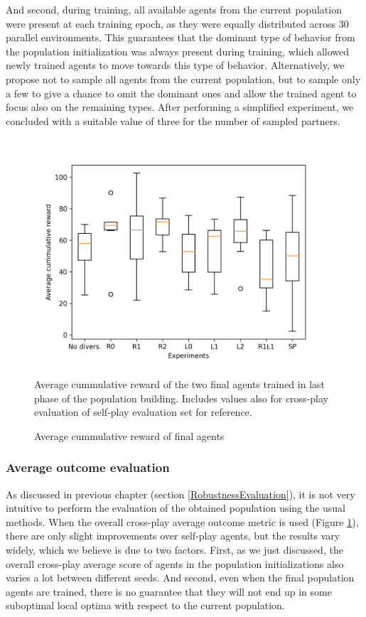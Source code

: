 And second, during training, all available agents from the current population were present at each training epoch, as they were equally distributed across 30 parallel environments.
This guarantees that the dominant type of behavior from the population initialization was always present during training, which allowed newly trained agents to move towards this type of behavior.
Alternatively, we propose not to sample all agents from the current population, but to sample only a few to give a chance to omit the dominant ones and allow the trained agent to focus also on the remaining types.
After performing a simplified experiment, we concluded with a suitable value of three for the number of sampled partners. 


\begin{figure}[!ht]
    \centering
    \includegraphics*[width=14cm]{../img/SimpleCnnExperimentsAvg.png}

    \caption{Average cummulative reward of final agents}
    \label{AvgCummulativeRewardEvaluated}
    \medskip
    \small 
    Average cummulative reward of the two final agents trained in last phase of the population building.
    Includes values also for cross-play evaluation of self-play evaluation set for reference. 

\end{figure}

\subsubsection{Average outcome evaluation}

As discussed in previous chapter (section \ref{RobustnessEvaluation}), it is not very intuitive to perform the evaluation of the obtained population using the usual methods. 
When the overall cross-play average outcome metric is used (Figure \ref{AvgCummulativeRewardEvaluated}), there are only slight improvements over self-play agents, but the results vary widely, which we believe is due to two factors.
First, as we just discussed, the overall cross-play average score of agents in the population initializations also varies a lot between different seeds.
And second, even when the final population agents are trained, there is no guarantee that they will not end up in some suboptimal local optima with respect to the current population.


